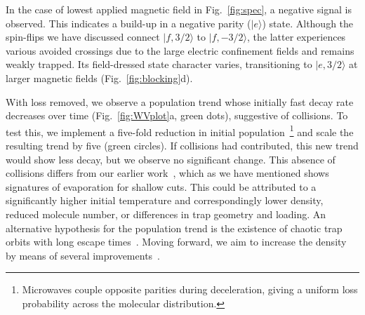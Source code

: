\documentclass[%
 reprint,
 amsmath,amssymb,
 aps,
prl,
]{revtex4-1}
\newcommand{\red}[1]{{\color{black} #1}}
\newcommand{\cmnt}[1]{\ignorespaces}
\begin{document}

In the case of lowest applied magnetic field in Fig.~\ref{fig:spec}, a negative signal is observed. This indicates a build-up in a negative parity ($|e\rangle$) state. Although the spin-flips we have discussed connect $|f,3/2\rangle$ to $|f,-3/2\rangle$, the latter experiences various avoided crossings due to the large electric confinement fields and remains weakly trapped.  Its field-dressed state character varies, transitioning to $|e,3/2\rangle$ at larger magnetic fields (Fig.~\ref{fig:blocking}d). %

With loss removed, we observe a population trend whose initially fast decay rate decreases over time (Fig.~\ref{fig:WVplot}a, green dots), suggestive of collisions. To test this, we implement a five-fold reduction in initial population~\footnote{Microwaves couple opposite parities during deceleration, giving a uniform loss probability across the molecular distribution.} and scale the resulting trend by five (green circles). If collisions had contributed, this new trend would show less decay, but we observe no significant change. This absence of collisions differs from our earlier work~\cite{Stuhl2012evap}, which as we have mentioned shows signatures of evaporation for shallow cuts. This could be attributed to a significantly higher initial temperature and correspondingly lower density, reduced molecule number, or differences in trap geometry and loading. 
\red{An alternative hypothesis for the population trend is the existence of chaotic trap orbits with long escape times~\cite{Gonzalez-Ferez2014}.} 
\cmnt{It is also possible that the spin-flip loss is playing a role even for the light evaporation cuts, although it is unclear how this could masquerade as a normalized low field density enhancement.} 
Moving forward, we aim to increase the density by means of several improvements~\cite{Even2015,Segev2017}.

\end{document}
